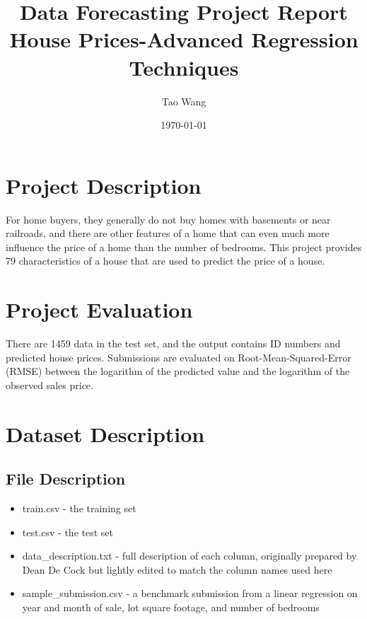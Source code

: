 \documentclass{amsart}
\begin{document}
	\title[A Short Running Title]{Data Forecasting Project Report\\{\small House Prices-Advanced Regression Techniques}}%
	\author{Tao Wang}
	\date{\today}
	\maketitle
	
	\section{Project Description}\label{sec-intro}
	For home buyers, they generally do not buy homes with basements or near railroads, and there are other features of a home that can even much more influence the price of a home than the number of bedrooms. This project provides 79 characteristics of a house that are used to predict the price of a house.
	\section{Project Evaluation}\label{sec-intro}
	There are 1459 data in the test set, and the output contains ID numbers and predicted house prices. Submissions are evaluated on Root-Mean-Squared-Error (RMSE) between the logarithm of the predicted value and the logarithm of the observed sales price.
	\section{Dataset Description}\label{sec-intro}
	\subsection{File Description}\label{sec-intro}
	\begin{itemize}
		\item train.csv - the training set
		\item test.csv - the test set
		\item data_description.txt - full description of each column, originally prepared by Dean De Cock but lightly edited to match the column names used here
		\item sample_submission.csv - a benchmark submission from a linear regression on year and month of sale, lot square footage, and number of bedrooms
	\end{itemize}
\end{document}
